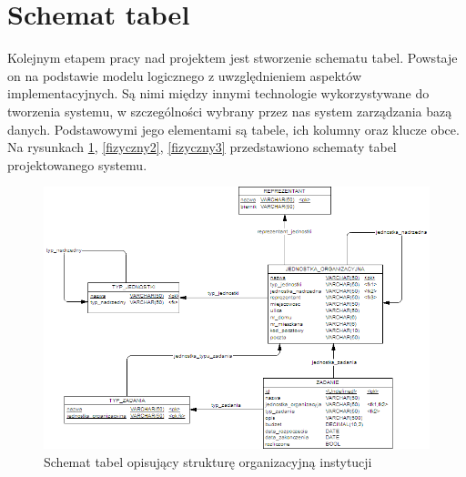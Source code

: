 \section[Schemat tabel][Schemat tabel]{Schemat tabel}
\label{modelFizyczny}
Kolejnym etapem pracy nad projektem jest stworzenie schematu tabel. Powstaje on na podstawie modelu logicznego z uwzględnieniem aspektów implementacyjnych. Są nimi między innymi technologie wykorzystywane do tworzenia systemu, w szczególności wybrany przez nas system zarządzania bazą danych. Podstawowymi jego elementami są tabele, ich kolumny oraz klucze obce. Na rysunkach \ref{fizyczny1}, \ref{fizyczny2}, \ref{fizyczny3} przedstawiono schematy tabel projektowanego systemu.



\begin{figure}[tdh]
    \begin{center}
	\includegraphics[scale=.8]{img/fizyczny1.png}
	\caption{Schemat tabel opisujący strukturę organizacyjną instytucji}
	\label{fizyczny1}
    \end{center}
\end{figure}
